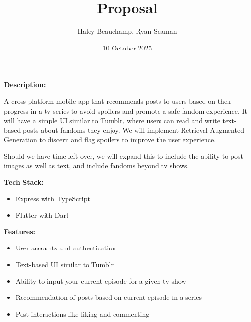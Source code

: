\documentclass{homework}
\author{Haley Beauchamp, Ryan Seaman}
\date{10 October 2025}
\title{Proposal}
\begin{document}
 \maketitle

\textbf{Description:} 

A cross-platform mobile app that recommends posts to users based on their progress in a tv series to avoid spoilers and promote a safe fandom experience. It will have a simple UI similar to Tumblr, where users can read and write text-based posts about fandoms they enjoy. We will implement Retrieval-Augmented Generation to discern and flag spoilers to improve the user experience. 

Should we have time left over, we will expand this to include the ability to post images as well as text, and include fandoms beyond tv shows.

\bigskip

\textbf{Tech Stack:}
\begin{itemize}
  \item Express with TypeScript
  \item Flutter with Dart
\end{itemize}

\bigskip

\textbf{Features:}
\begin{itemize}
  \item User accounts and authentication
  \item Text-based UI similar to Tumblr
  \item Ability to input your current episode for a given tv show
  \item Recommendation of posts based on current episode in a series
  \item Post interactions like liking and commenting
\end{itemize}

% 
% 
\end{document}
